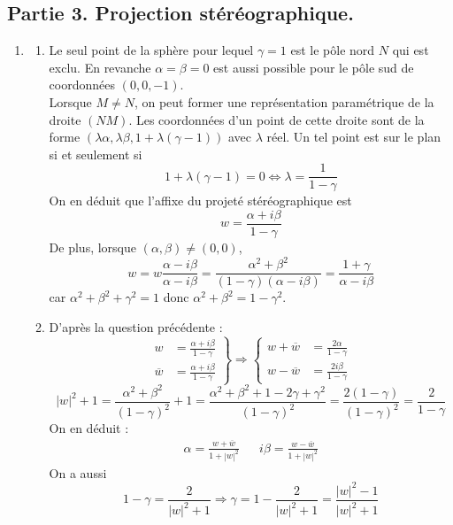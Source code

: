 \subsection*{Partie 3. Projection stéréographique.}
\begin{enumerate}
 \item 

\begin{enumerate}
\item Le seul point de la sphère pour lequel $\gamma=1$ est le pôle nord $N$ qui est exclu. En revanche $\alpha=\beta=0$ est aussi possible pour le pôle sud de coordonnées $(0,0,-1)$.\\
Lorsque $M\neq N$, on peut former une représentation paramétrique de la droite $(NM)$. Les coordonnées d'un point de cette droite sont de la forme $(\lambda\alpha,\lambda\beta,1+\lambda(\gamma-1))$ avec $\lambda$ réel. Un tel point est sur le plan si et seulement si
\begin{displaymath}
 1+\lambda(\gamma-1)=0\Leftrightarrow \lambda = \frac{1}{1-\gamma}
\end{displaymath}
On en déduit que l'affixe du projeté stéréographique est
\begin{displaymath}
 w=\frac{\alpha +i\beta}{1-\gamma}
\end{displaymath}
De plus, lorsque $(\alpha,\beta)\neq (0,0)$,
\begin{displaymath}
 w=w\frac{\alpha-i\beta}{\alpha-i\beta}=\frac{\alpha^2+\beta^2}{(1-\gamma)(\alpha-i\beta)}=\frac{1+\gamma}{\alpha-i\beta}
\end{displaymath}
car $\alpha^2+\beta^2+\gamma^2=1$ donc $\alpha^2+\beta^2=1-\gamma^2$.
\item D'après la question précédente :
\begin{displaymath}
 \left. 
\begin{aligned}
 w &= \frac{\alpha +i\beta}{1-\gamma}\\
 \overline{w}  &= \frac{\alpha +i\beta}{1-\gamma}
\end{aligned}
\right\rbrace 
\Rightarrow
\left\lbrace 
\begin{aligned}
 w+\overline{w} &=\frac{2\alpha}{1-\gamma}\\
w-\overline{w} &=\frac{2i\beta}{1-\gamma}
\end{aligned}
\right. 
\end{displaymath}
\begin{displaymath}
 |w|^2+1=\frac{\alpha^2+\beta^2}{(1-\gamma)^2}+1
=\frac{\alpha^2+\beta^2+1-2\gamma + \gamma^2}{(1-\gamma)^2}
=\frac{2(1-\gamma)}{(1-\gamma)^2}=\frac{2}{1-\gamma}
\end{displaymath}
On en déduit :
\begin{align*}
 \alpha = \frac{w+\overline{w}}{1+|w|^2} & & i\beta = \frac{w - \overline{w}}{1+|w|^2}
\end{align*}
On a aussi 
\begin{displaymath}
 1-\gamma=\frac{2}{|w|^2+1}\Rightarrow \gamma=1-\frac{2}{|w|^2+1}=\frac{|w|^2-1}{|w|^2+1}
\end{displaymath}


\end{enumerate}
\end{enumerate}
